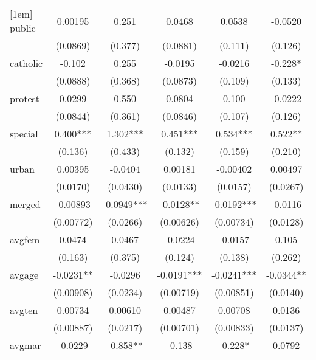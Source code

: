 \begin{table}[htbp]
\begin{tabular}{l*{5}{c}}
[1em]
public      &     0.00195   &       0.251   &      0.0468   &      0.0538   &     -0.0520   \\
            &    (0.0869)   &     (0.377)   &    (0.0881)   &     (0.111)   &     (0.126)   \\
[1em]
catholic    &      -0.102   &       0.255   &     -0.0195   &     -0.0216   &      -0.228*  \\
            &    (0.0888)   &     (0.368)   &    (0.0873)   &     (0.109)   &     (0.133)   \\
[1em]
protest     &      0.0299   &       0.550   &      0.0804   &       0.100   &     -0.0222   \\
            &    (0.0844)   &     (0.361)   &    (0.0846)   &     (0.107)   &     (0.126)   \\
[1em]
special     &       0.400***&       1.302***&       0.451***&       0.534***&       0.522** \\
            &     (0.136)   &     (0.433)   &     (0.132)   &     (0.159)   &     (0.210)   \\
[1em]
urban       &     0.00395   &     -0.0404   &     0.00181   &    -0.00402   &     0.00497   \\
            &    (0.0170)   &    (0.0430)   &    (0.0133)   &    (0.0157)   &    (0.0267)   \\
[1em]
merged      &    -0.00893   &     -0.0949***&     -0.0128** &     -0.0192***&     -0.0116   \\
            &   (0.00772)   &    (0.0266)   &   (0.00626)   &   (0.00734)   &    (0.0128)   \\
[1em]
avgfem      &      0.0474   &      0.0467   &     -0.0224   &     -0.0157   &       0.105   \\
            &     (0.163)   &     (0.375)   &     (0.124)   &     (0.138)   &     (0.262)   \\
[1em]
avgage      &     -0.0231** &     -0.0296   &     -0.0191***&     -0.0241***&     -0.0344** \\
            &   (0.00908)   &    (0.0234)   &   (0.00719)   &   (0.00851)   &    (0.0140)   \\
[1em]
avgten      &     0.00734   &     0.00610   &     0.00487   &     0.00708   &      0.0136   \\
            &   (0.00887)   &    (0.0217)   &   (0.00701)   &   (0.00833)   &    (0.0137)   \\
[1em]
avgmar      &     -0.0229   &      -0.858** &      -0.138   &      -0.228*  &      0.0792   \\

\end{tabular}
\end{table}
